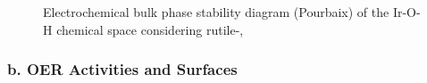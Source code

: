 \begin{figure}
\centering
{}
\caption{\label{fig:bulk_pourbaix}
Electrochemical bulk phase stability diagram (Pourbaix) of the Ir-O-H chemical space considering rutile-,
}
\end{figure}


\subsubsection{b. OER Activities and Surfaces}

